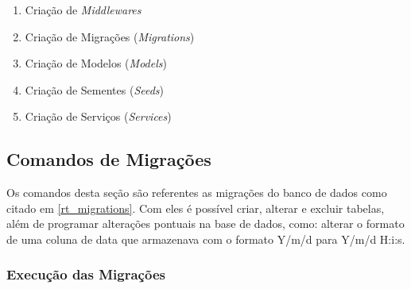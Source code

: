 \begin{enumerate}
    \item{Criação de \textit{Middlewares}}

    \spaceH{}
    
    \label{scripts/cosmo_make_middleware.bash}

    \item{Criação de Migrações (\textit{Migrations})}

    \spaceH{}
    
    \label{scripts/cosmo_make_migration.bash}

    \item{Criação de Modelos (\textit{Models})}

    \spaceH{}
    
    \label{scripts/cosmo_make_model.bash}

    \item{Criação de Sementes (\textit{Seeds})}

    \spaceH{}
    
    \label{scripts/cosmo_make_seed.bash}

    \item{Criação de Serviços (\textit{Services})}

    \spaceH{}
    
    \label{scripts/cosmo_make_service.bash}
\end{enumerate}

\subsection{Comandos de Migrações}

Os comandos desta seção são referentes as migrações do banco de dados como citado em \ref{rt_migrations}. Com eles é possível criar, alterar e excluir tabelas, além de programar alterações pontuais na base de dados, como: alterar o formato de uma coluna de data que armazenava com o formato Y/m/d para Y/m/d H:i:s.

\subsubsection{Execução das Migrações}

